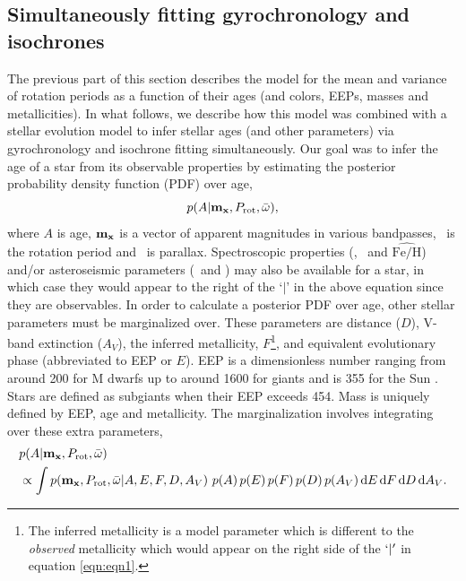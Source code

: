 \subsection{Simultaneously fitting gyrochronology and isochrones}
The previous part of this section describes the model for the mean and
variance of rotation periods as a function of their ages (and colors, EEPs,
masses and metallicities).
In what follows, we describe how this model was combined with a stellar
evolution model to infer stellar ages (and other parameters) via
gyrochronology and isochrone fitting simultaneously.
Our goal was to infer the age of a star from its observable properties by
estimating the posterior probability density function (PDF) over age,
\begin{equation} \label{eqn:eqn1}
    p(A|{\bf m_x}, P_{\mathrm{rot}}, \bar{\omega}),
\end{equation}
where $A$ is age, ${\bf m_x}$ is a vector of
apparent magnitudes in various bandpasses,
\prot\ is the rotation period and \pmega\ is parallax.
Spectroscopic properties (\teff, \logg\ and $\hat{\mathrm{Fe/H}}$) and/or
asteroseismic parameters (\dnu\ and \numax) may also be available for a star,
in which case they would appear to the right of the `$|$' in the above
equation since they are observables.
In order to calculate a posterior PDF over age, other stellar parameters must
be marginalized over.
These parameters are distance ($D$), V-band extinction ($A_V$), the
inferred metallicity, $F$\footnote{The inferred metallicity is a
model parameter which is different to the {\it observed} metallicity which
would appear on the right side of the $`|'$ in equation \ref{eqn:eqn1}.},
and equivalent evolutionary phase (abbreviated to EEP or
$E$).
EEP is a dimensionless number ranging from around 200 for M dwarfs up
to around 1600 for giants and is 355 for the Sun \citep[see][]{dotter2016,
choi2016}.
Stars are defined as subgiants when their EEP exceeds 454.
Mass is uniquely defined by EEP, age and metallicity.
The marginalization involves integrating over these extra parameters,
\begin{eqnarray} \label{eqn:bayes}
    & p(A|{\bf m_x},
    P_{\mathrm{rot}}, \bar{\omega})
\\ \nonumber
    & \propto \int p({\bf m_x},
    P_\mathrm{rot}, \bar{\omega}|
    A, E, F, D, A_V)~p(A)\, p(E)\, p(F)\, p(D)\, p(A_V)\, \mathrm{d}E\,
    \mathrm{d}F\, \mathrm{d}D\, \mathrm{d}A_V.
\end{eqnarray}
